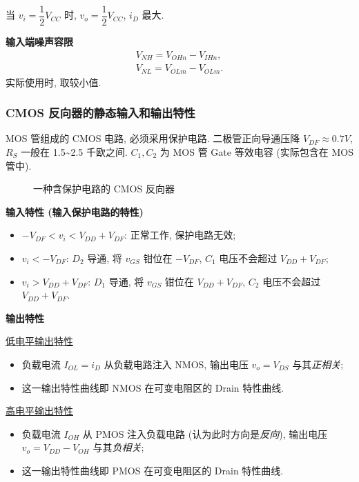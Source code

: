 当 $v_i=\dfrac{1}{2}V_{CC}$ 时, $v_o=\dfrac{1}{2}V_{CC}$, $i_D$ 最大.

\textbf{输入端噪声容限}
\begin{gather}
    V_{NH}=V_{OHn}-V_{IHn}, \\
    V_{NL}=V_{OLm}-V_{OLm}.
\end{gather}
实际使用时, 取较小值.

\subsubsection{CMOS 反向器的静态输入和输出特性}
MOS 管组成的 CMOS 电路, 必须采用保护电路. 二极管正向导通压降 $V_{DF}\approx0.7 V$, $R_S$ 一般在 1.5\textasciitilde2.5 千欧之间. $C_1,C_2$ 为 MOS 管 Gate 等效电容 (实际包含在 MOS 管中).

\begin{figure}[H]
    \centering

    \caption{一种含保护电路的 CMOS 反向器}
\end{figure}

\textbf{输入特性 (输入保护电路的特性)}
\begin{itemize}
    \item $-V_{DF}<v_i<V_{DD}+V_{DF}$: 正常工作, 保护电路无效;
    \item $v_i<-V_{DF}$: $D_2$ 导通, 将 $v_{GS}$ 钳位在 $-V_{DF}$, $C_1$ 电压不会超过 $V_{DD}+V_{DF}$;
    \item $v_i>V_{DD}+V_{DF}$: $D_1$ 导通, 将 $v_{GS}$ 钳位在 $V_{DD}+V_{DF}$, $C_2$ 电压不会超过 $V_{DD}+V_{DF}$.
\end{itemize}

\textbf{输出特性}

\underline{低电平输出特性}
\begin{itemize}
    \item 负载电流 $I_{OL}=i_D$ 从负载电路注入 NMOS, 输出电压 $v_o=V_{DS}$ 与其\textit{正相关};
    \item 这一输出特性曲线即 NMOS 在可变电阻区的 Drain 特性曲线.
\end{itemize}

\underline{高电平输出特性}
\begin{itemize}
    \item 负载电流 $I_{OH}$ 从 PMOS 注入负载电路 (认为此时方向是\textit{反向}), 输出电压 $v_o=V_{DD}-V_{OH}$ 与其\textit{负相关};
    \item 这一输出特性曲线即 PMOS 在可变电阻区的 Drain 特性曲线.
\end{itemize}

